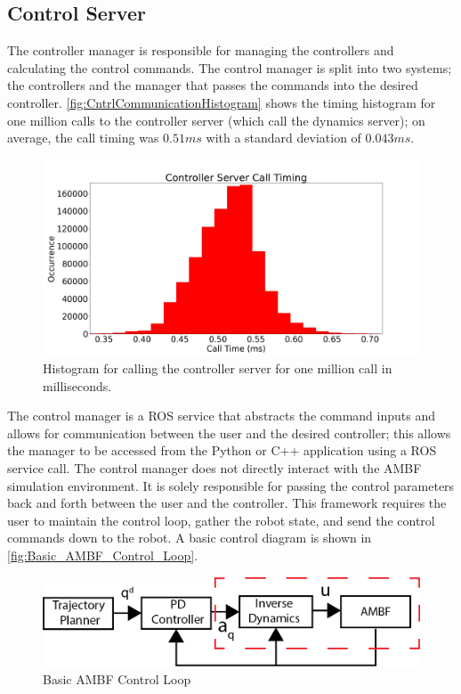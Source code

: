  
 
 \subsection{Control Server}
 
 The controller manager is responsible for managing the controllers and calculating the control commands. The control manager is split into two systems; the controllers and the manager that passes the commands into the desired controller. 
\autoref{fig:CntrlCommunicationHistogram} shows the timing histogram for one million calls to the controller server (which call the dynamics server); on average, the call timing was $0.51ms$ with a standard deviation of $0.043ms$.  

 \begin{figure}
     \centering
     \includegraphics[scale=0.35]{images/software/control_loop_timing.png}
     \caption[Controller Server Timing Histogram]{Histogram for calling the controller server for one million call in milliseconds.}
     \label{fig:CntrlCommunicationHistogram}
 \end{figure}


The control manager is a ROS service that abstracts the command inputs and allows for communication between the user and the desired controller; this allows the manager to be accessed from the Python or C++ application using a ROS service call. The control manager does not directly interact with the AMBF simulation environment. It is solely responsible for passing the control parameters back and forth between the user and the controller. This framework requires the user to maintain the control loop, gather the robot state, and send the control commands down to the robot. A basic control diagram is shown in \autoref{fig:Basic_AMBF_Control_Loop}.


\begin{figure}[h!]
    \centering
    \includegraphics[scale=1.25]{images/sim/control_loop_basic.png}
    \caption[Basic AMBF Control Loop]{Basic AMBF Control Loop}
    \label{fig:Basic_AMBF_Control_Loop}
\end{figure}

